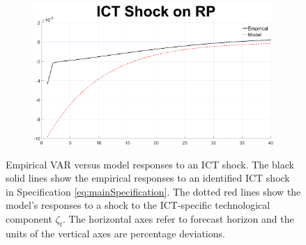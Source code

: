 \documentclass[12pt]{article}
\begin{document}
\begin{figure}[h!]
\begin{subfigure}{.5\textwidth}
	\end{subfigure}%
	\begin{subfigure}{.5\textwidth}
		\centering
		\includegraphics[width=1\linewidth]{MainFigures/fig_ICT_Shock_on_RP_IRmatching_together}
	\end{subfigure}
	\caption{Empirical VAR versus model responses to an ICT shock. The black solid lines show the empirical responses to an identified ICT shock in Specification \ref{eq:mainSpecification}. The dotted red lines show the model’s responses to a shock to the ICT-specific technological component $\zeta_t$. The horizontal axes refer to forecast horizon and the units of the vertical axes are percentage deviations.}
	\label{fig:IR_matching}
\end{figure}

 
\end{document}
